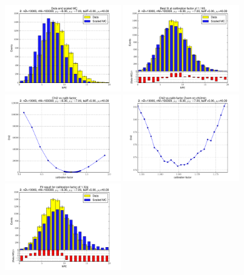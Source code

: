 
 \begin{figure}[htbp] \begin{center} 
\includegraphics[width=0.45\textwidth]{../FIGURES/02/FIG_Data_and_scaled_MC.pdf} 
\includegraphics[width=0.45\textwidth]{../FIGURES/02/FIG_Best_fit_at_calibration_factor_of_1_165.pdf} 
\includegraphics[width=0.45\textwidth]{../FIGURES/02/FIG_Chi2_vs_calib_factor.pdf} 
\includegraphics[width=0.45\textwidth]{../FIGURES/02/FIG_Chi2_vs_calib_factor_Zoom_on_chi2min.pdf} 
\includegraphics[width=0.45\textwidth]{../FIGURES/02/FIG_Fit_result_for_calibration_factor_of_1_324.pdf} 

\end{center}
\end{figure}
